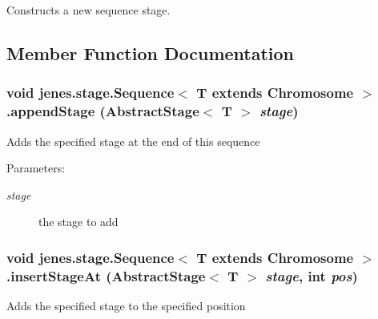 Constructs a new sequence stage. 

\subsection{Member Function Documentation}
\hypertarget{classjenes_1_1stage_1_1_sequence_3_01_t_01extends_01_chromosome_01_4_7d0e59aeed366cb6f71f754f61bfceb3}{
\subsubsection[appendStage]{\setlength{\rightskip}{0pt plus 5cm}void jenes.stage.Sequence$<$ T extends Chromosome $>$.appendStage (AbstractStage$<$ T $>$ {\em stage})}}
\label{classjenes_1_1stage_1_1_sequence_3_01_t_01extends_01_chromosome_01_4_7d0e59aeed366cb6f71f754f61bfceb3}


Adds the specified stage at the end of this sequence 

\begin{Desc}
\item[Parameters:]
\begin{description}
\item[{\em stage}]the stage to add \end{description}
\end{Desc}
\hypertarget{classjenes_1_1stage_1_1_sequence_3_01_t_01extends_01_chromosome_01_4_922e6363fc19620738e95ddfc649ea6e}{
\subsubsection[insertStageAt]{\setlength{\rightskip}{0pt plus 5cm}void jenes.stage.Sequence$<$ T extends Chromosome $>$.insertStageAt (AbstractStage$<$ T $>$ {\em stage}, \/  int {\em pos})}}
\label{classjenes_1_1stage_1_1_sequence_3_01_t_01extends_01_chromosome_01_4_922e6363fc19620738e95ddfc649ea6e}


Adds the specified stage to the specified position 

